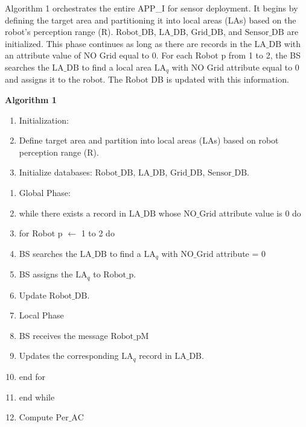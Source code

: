 \documentclass{article}
\begin{document}
Algorithm 1 orchestrates the entire APP\_I for sensor deployment. It begins by defining the target area and partitioning it into local areas (LAs) based on the robot’s perception range (R). $\text{Robot\_DB}$, $\text{LA\_DB}$, $\text{Grid\_DB}$, and $\text{Sensor\_DB}$ are initialized. This phase continues as long as there are records in the $\text{LA\_DB}$ with an attribute value of NO Grid equal to 0. For each Robot p from 1 to 2, the BS searches the $\text{LA\_DB}$ to find a local area $\text{LA}_q$ with NO Grid attribute equal to 0 and assigns it to the robot. The Robot DB is updated with this information.

\clearpage %

\noindent\textbf{Algorithm 1}
\begin{enumerate}[label=\arabic*:]
    \item Initialization:
    \item Define target area and partition into local areas (LAs) based on robot perception range (R).
    \item Initialize databases: $\text{Robot\_DB}$, $\text{LA\_DB}$, $\text{Grid\_DB}$, $\text{Sensor\_DB}$.
\end{enumerate}

\begin{enumerate}[label=\arabic*:, start=4]
    \item Global Phase:
    \item while there exists a record in $\text{LA\_DB}$ whose $\text{NO\_Grid}$ attribute value is 0 do
    \item \quad for Robot p $\leftarrow$ 1 to 2 do
    \item \quad \quad BS searches the $\text{LA\_DB}$ to find a $\text{LA}_q$ with $\text{NO\_Grid}$ attribute = 0
    \item \quad \quad BS assigns the $\text{LA}_q$ to $\text{Robot\_p}$.
    \item \quad \quad Update $\text{Robot\_DB}$.
    \item \quad \quad Local Phase
    \item \quad \quad BS receives the message $\text{Robot\_pM}$
    \item \quad \quad Updates the corresponding $\text{LA}_q$ record in $\text{LA\_DB}$.
    \item \quad end for
    \item end while
    \item Compute $\text{Per\_AC}$
\end{enumerate}
\end{document}
